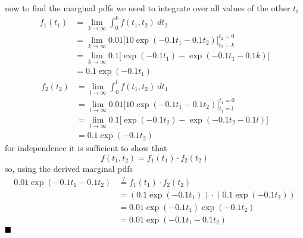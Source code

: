 \documentclass{article}
\begin{document}
now to find the marginal pdfs we need to integrate over all values of the other $t_i$
\begin{align*}
    f_1(t_1) &= \lim_{k \rightarrow \infty} \int_{0}^{k} f(t_1, t_2) \ dt_2 \\
    &= \lim_{k \rightarrow \infty} 0.01 \biggl[ 10 \exp(-0.1t_1 - 0.1t_2) \biggr]_{t_2=k}^{t_2=0} \\
    &= \lim_{k \rightarrow \infty} 0.1 \biggl[\exp(-0.1t_1) - \exp(-0.1t_1 - 0.1k) \biggr] \\
    &=  0.1 \exp(-0.1t_1)
\end{align*}
\begin{align*}
    f_2(t_2) &= \lim_{l \rightarrow \infty} \int_{0}^{l} f(t_1, t_2) \ dt_1 \\
    &= \lim_{l \rightarrow \infty} 0.01 \biggl[ 10 \exp(-0.1t_1 - 0.1t_2) \biggr]_{t_1=l}^{t_1=0} \\
    &= \lim_{l \rightarrow \infty} 0.1 \biggl[\exp(-0.1t_2) - \exp(-0.1t_2 - 0.1l) \biggr] \\
    &=  0.1 \exp(-0.1t_2)
\end{align*}
for independence it is sufficient to show that
\[ f(t_1, t_2) = f_1(t_1) \cdot f_2(t_2) \]
so, using the derived marginal pdfs
\begin{align*}
    0.01 \exp (-0.1t_1 - 0.1t_2) &\stackrel{?}{=} f_1(t_1) \cdot f_2(t_2) \\
    &= (0.1 \exp(-0.1t_1)) \cdot (0.1 \exp(-0.1t_2)) \\
    &= 0.01 \exp(-0.1t_1) \exp(-0.1t_2) \\
    &= 0.01 \exp(-0.1t_1 -0.1t_2) \tag{properties of exp}
\end{align*}
$ \hfill \blacksquare $
\end{document}
